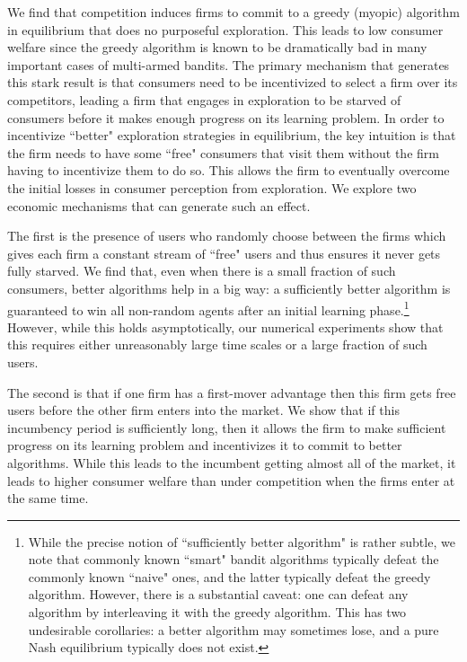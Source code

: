 We find that competition induces firms to commit to a greedy (myopic) algorithm in equilibrium that does no purposeful exploration. This leads to low consumer welfare since the greedy algorithm is known to be dramatically bad in many important cases of multi-armed bandits. The primary mechanism that generates this stark result is that consumers need to be incentivized to select a firm over its competitors, leading a firm that engages in exploration to be starved of consumers before it makes enough progress on its learning problem. In order to incentivize ``better" exploration strategies in equilibrium, the key intuition is that the firm needs to have some ``free" consumers that visit them without the firm having to incentivize them to do so. This allows the firm to eventually overcome the initial losses in consumer perception from exploration. We explore two economic mechanisms that can generate such an effect.

The first is the presence of users who randomly choose between the firms which gives each firm a constant stream of ``free" users and thus ensures it never gets fully starved. We find that, even when there is a small fraction of such consumers, better algorithms help in a big way: a sufficiently better algorithm is guaranteed to win all non-random agents after an initial learning phase.\footnote{While the precise notion of ``sufficiently better algorithm" is rather subtle, we note that commonly known ``smart" bandit algorithms typically defeat the commonly known ``naive" ones, and the latter typically defeat the greedy algorithm. However, there is a substantial caveat: one can defeat any algorithm by interleaving it with the greedy algorithm. This has two undesirable corollaries: a better algorithm may sometimes lose, and a pure Nash equilibrium typically does not exist.} However, while this holds asymptotically, our numerical experiments show that this requires either unreasonably large time scales or a large fraction of such users.

The second is that if one firm has a first-mover advantage then this firm gets free users before the other firm enters into the market. We show that if this incumbency period is sufficiently long, then it allows the firm to make sufficient progress on its learning problem and incentivizes it to commit to better algorithms. While this leads to the incumbent getting almost all of the market, it leads to higher consumer welfare than under competition when the firms enter at the same time.


